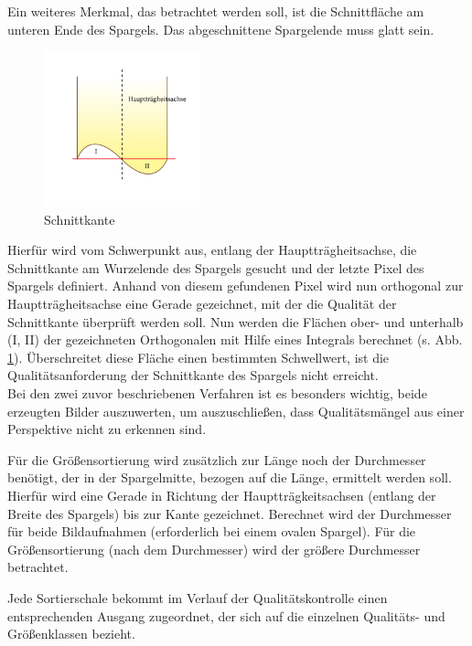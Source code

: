 \documentclass{ezb}
\begin{document}
\clearpage
Ein weiteres Merkmal, das betrachtet werden soll, ist die Schnittfläche am unteren Ende des Spargels. Das abgeschnittene Spargelende muss glatt sein.\\
\begin{figure}
\includegraphics[width=0.4\textwidth]{schnitt.png}
\caption{\label{fig:schnitt}Schnittkante}
\end{figure}
Hierfür wird vom Schwerpunkt aus, entlang der Hauptträgheitsachse, die Schnittkante am Wurzelende des Spargels gesucht und der letzte Pixel des Spargels definiert.
Anhand von diesem gefundenen Pixel wird nun orthogonal zur Hauptträgheitsachse eine Gerade gezeichnet, mit der  die Qualität der Schnittkante überprüft werden soll.
Nun werden die Flächen ober- und unterhalb (I, II) der gezeichneten Orthogonalen mit Hilfe eines Integrals berechnet (s. Abb. \ref{fig:schnitt}).
Überschreitet diese Fläche einen bestimmten Schwellwert, ist die Qualitätsanforderung der Schnittkante des Spargels nicht erreicht.
\\
Bei den zwei zuvor beschriebenen Verfahren ist es besonders wichtig, beide erzeugten Bilder auszuwerten, um auszuschließen, dass Qualitätsmängel aus einer Perspektive nicht zu erkennen sind.

Für die Größensortierung wird zusätzlich zur Länge noch der Durchmesser benötigt, der in der Spargelmitte, bezogen auf die Länge, ermittelt werden soll. Hierfür wird eine Gerade in Richtung der Hauptträgkeitsachsen (entlang der Breite des Spargels) bis zur Kante gezeichnet. Berechnet wird der Durchmesser für beide Bildaufnahmen (erforderlich bei einem ovalen Spargel). Für die Größensortierung (nach dem Durchmesser) wird der größere Durchmesser betrachtet.

Jede Sortierschale bekommt im Verlauf der Qualitätskontrolle einen entsprechenden Ausgang zugeordnet, der sich auf die einzelnen Qualitäts- und Größenklassen bezieht.
\end{document}
